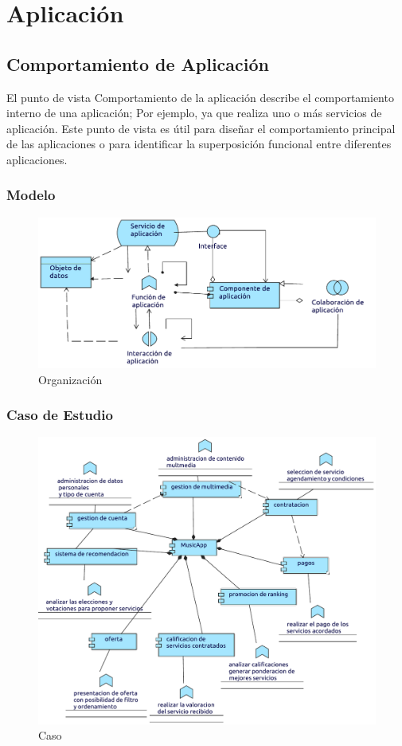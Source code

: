 \chapter{Aplicación}

\section{Comportamiento de Aplicación}
El punto de vista Comportamiento de la aplicación describe el comportamiento interno de una aplicación; Por ejemplo, ya que realiza uno o más servicios de aplicación. Este punto de vista es útil para diseñar el comportamiento principal de las aplicaciones o para identificar la superposición funcional entre diferentes aplicaciones.
\subsection{Modelo}
\begin{figure}[h!]
	\centering
	\includegraphics[width=\linewidth]{Arquitectura/Aplicacion/imgs/ComportamientoMetamodelo.pdf}
	\caption{Organización}
\end{figure}
\newpage
\subsection{Caso de Estudio}

\begin{figure}[h!]
	\centering
	\includegraphics[width=\linewidth]{Arquitectura/Aplicacion/imgs/Comportamiento.pdf}
	\caption{Caso}
\end{figure}


